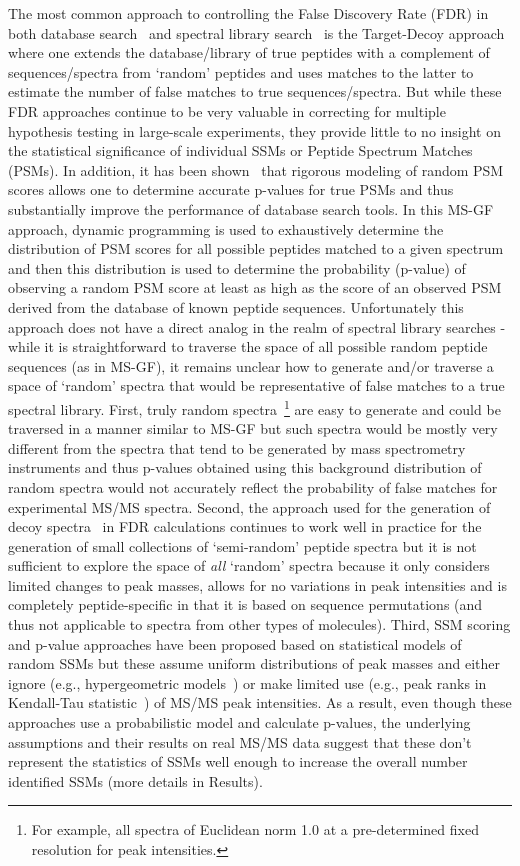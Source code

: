 \documentclass[endnotes,11pt]{article}
\begin{document}
The most common approach to controlling the False Discovery Rate (FDR) in both database search~\cite{elias07} and spectral library search~\cite{lam10} is the Target-Decoy approach where one extends the database/library of true peptides with a complement of sequences/spectra from `random' peptides and uses matches to the latter to estimate the number of false matches to true sequences/spectra. But while these FDR approaches continue to be very valuable in correcting for multiple hypothesis testing in large-scale experiments, they provide little to no insight on the statistical significance of individual SSMs or Peptide Spectrum Matches (PSMs). In addition, it has been shown~\cite{kim08,kim10cidetd,gupta11} that rigorous modeling of random PSM scores allows one to determine accurate p-values for true PSMs and thus substantially improve the performance of database search tools. In this MS-GF~\cite{kim08} approach, dynamic programming is used to exhaustively determine the distribution of PSM scores for all possible peptides matched to a given spectrum and then this distribution is used to determine the probability (p-value) of observing a random PSM score at least as high as the score of an observed PSM derived from the database of known peptide sequences. Unfortunately this approach does not have a direct analog in the realm of spectral library searches \-- while it is straightforward to traverse the space of all possible random peptide sequences (as in MS-GF), it remains unclear how to generate and/or traverse a space of `random' spectra that would be representative of false matches to a true spectral library.
%
First, truly random spectra~\footnote{For example, all spectra of Euclidean norm 1.0 at a pre-determined fixed resolution for peak intensities.} are easy to generate and could be traversed in a manner similar to MS-GF but such spectra would be mostly very different from the spectra that tend to be generated by mass spectrometry instruments and thus p-values obtained using this background distribution of random spectra would not accurately reflect the probability of false matches for experimental MS/MS spectra.
%
Second, the approach used for the generation of decoy spectra~\cite{lam10} in FDR calculations continues to work well in practice for the generation of small collections of `semi-random' peptide spectra but it is not sufficient to explore the space of {\em all} `random' spectra because it only considers limited changes to peak masses, allows for no variations in peak intensities and is completely peptide-specific in that it is based on sequence permutations (and thus not applicable to spectra from other types of molecules).
%
Third, SSM scoring and p-value approaches have been proposed based on statistical models of random SSMs but these assume uniform distributions of peak masses and either ignore (e.g., hypergeometric models~\cite{yen11,dasari12}) or make limited use (e.g., peak ranks in Kendall-Tau statistic~\cite{dasari12}) of MS/MS peak intensities. As a result, even though these approaches use a probabilistic model and calculate p-values, the underlying assumptions and their results on real MS/MS data suggest that these don't represent the statistics of SSMs well enough to increase the overall number identified SSMs (more details in Results).
\end{document}
